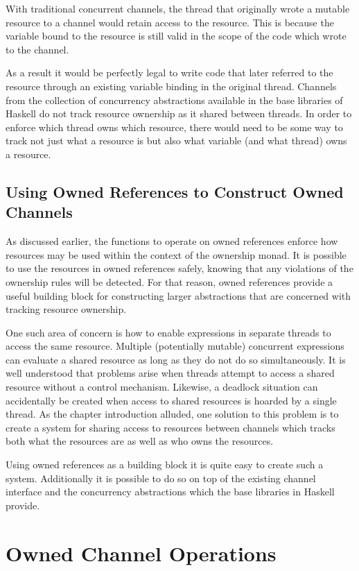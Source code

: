 \documentclass[onehalf,11pt]{beavtex}
\begin{document}
With traditional concurrent channels, the thread that originally wrote
a mutable resource to a channel would retain access to the resource. This is
because the variable bound to the resource is still valid in the scope of the
code which wrote to the channel.

As a result it would be perfectly legal to write code that later referred to the
resource through an existing variable binding in the original thread.
Channels from the collection of concurrency abstractions available in the
base libraries of Haskell do not track resource ownership as it shared
between threads.
In order to enforce which thread owns which resource, there would need to be
some way to track not just what a resource is but also what variable (and what
thread) owns a resource.

\subsection{Using Owned References to Construct Owned Channels}

As discussed earlier, the functions to operate on owned references enforce
how resources may be used within the context of the ownership monad.
It is possible to use the resources in owned references safely, knowing that any
violations of the ownership rules will be detected.
For that reason, owned references provide a useful building block for constructing
larger abstractions that are concerned with tracking resource ownership.

One such area of concern is how to enable expressions in separate
threads to access the same resource.
Multiple (potentially mutable) concurrent expressions can evaluate a shared
resource as long as they do not do so simultaneously.
It is well understood that problems arise when threads attempt to access a
shared resource without a control mechanism.
Likewise, a deadlock situation can accidentally be created
when access to shared resources is hoarded by a single thread.
As the chapter introduction alluded, one solution to this problem is to
create a system for sharing access to resources between channels which tracks
both what the resources are as well as who owns the resources.

Using owned references as a building block it is quite easy to create
such a system.  Additionally it is possible to do so on top of the existing
channel interface and the concurrency abstractions which the base libraries
in Haskell provide.

\section{Owned Channel Operations}
\end{document}
